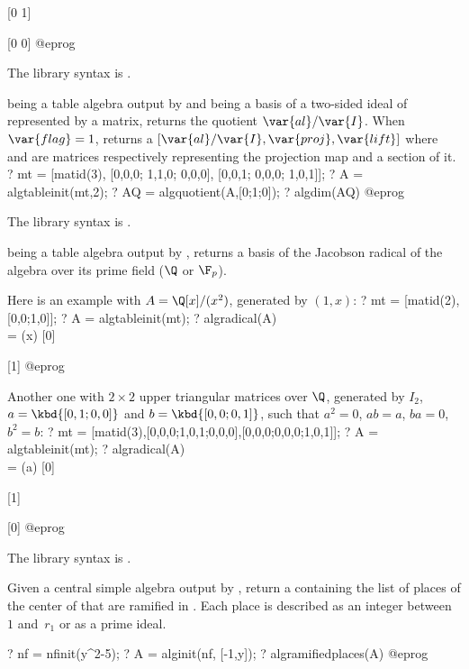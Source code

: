 [0 1]

[0 0]
@eprog

The library syntax is .

\label{se:algquotient}
 being a table algebra output by  and 
being a basis of a two-sided ideal of  represented by a matrix,
returns the quotient $\var{al}/\var{I}$. When $\var{flag}=1$, returns a
 $[\var{al}/\var{I},\var{proj},\var{lift}]$ where  and
 are matrices respectively representing the projection map and a
section of it.
\bprog
? mt = [matid(3), [0,0,0; 1,1,0; 0,0,0], [0,0,1; 0,0,0; 1,0,1]];
? A = algtableinit(mt,2);
? AQ = algquotient(A,[0;1;0]);
? algdim(AQ)
@eprog

The library syntax is .

\label{se:algradical}
 being a table algebra output by , returns a
basis of the Jacobson radical of the algebra  over its prime field
($\Q$ or $\F_p$).

Here is an example with $A = \Q[x]/(x^2)$, generated by $(1,x)$:
\bprog
? mt = [matid(2),[0,0;1,0]];
? A = algtableinit(mt);
? algradical(A) \\ = (x)
[0]

[1]
@eprog

Another one with $2\times 2$ upper triangular matrices over $\Q$, generated
by $I_2$, $a = \kbd{[0,1;0,0]}$ and $b = \kbd{[0,0;0,1]}$, such that $a^2 =
0$, $ab = a$, $ba = 0$, $b^2 = b$:
\bprog
? mt = [matid(3),[0,0,0;1,0,1;0,0,0],[0,0,0;0,0,0;1,0,1]];
? A = algtableinit(mt);
? algradical(A) \\ = (a)
[0]

[1]

[0]
@eprog

The library syntax is .

\label{se:algramifiedplaces}
Given a central simple algebra  output by , return a
 containing the list of places of the center of  that are
ramified in . Each place is described as an integer between~$1$
and~$r_1$ or as a prime ideal.

\bprog
? nf = nfinit(y^2-5);
? A = alginit(nf, [-1,y]);
? algramifiedplaces(A)
@eprog

